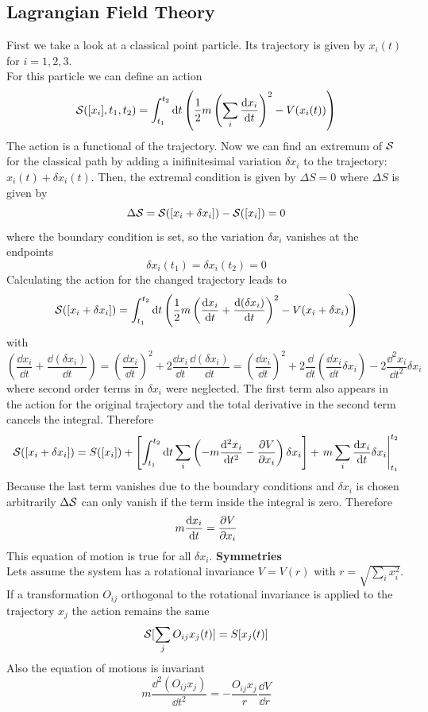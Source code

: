 \subsection{Lagrangian Field Theory}
First we take a look at a classical point particle. Its trajectory is given by $x_i(t)$ for $i = 1,2,3$.\\
For this particle we can define an action
\[ \mathcal{S}( [x_i], t_1, t_2 ) = \int_{t_1}^{t_2} {\rm d} t \left(\frac{1}{2} m \left( \sum_i \frac{{\rm d} x_i}{{\rm d} t} \right)^2 - V(x_i(t)) \right)
\]
The action is a functional of the trajectory. Now we can find an extremum of $\mathcal{S}$ for the classical path by adding a inifinitesimal variation $\delta x_i$ to the trajectory: $x_i(t) + \delta x_i(t)$. Then, the extremal condition is given by $\Delta S = 0$ where $\Delta S$ is given by
\[ \Delta \mathcal{S} = \mathcal{S}( [x_i + \delta x_i]) - \mathcal{S}([x_i]) = 0\]
where the boundary condition is set, so the variation $\delta x_i$ vanishes at the endpoints
\[ \delta x_i(t_1) = \delta x_i(t_2) = 0\]
Calculating the action for the changed trajectory leads to
\[ \mathcal{S}( [x_i + \delta x_i]) = \int_{t_1}^{t_2} {\rm d} t \left( \frac{1}{2} m \left( \frac{{\rm d} x_i}{{\rm d} t} + \frac{{\rm d} (\delta x_i)}{{\rm d} t} \right)^2 - V(x_i + \delta x_i) \right)
\]
with
\[  \left( \frac{\dd x_i}{\dd t} + \frac{ \dd ( \delta x_i)}{\dd t} \right) = \left( \frac{ \dd x_i}{\dd t} \right)^2 + 2 \frac{ \dd x_i }{\dd t} \frac{ \dd (\delta x_i)}{\dd t} = \left( \frac{\dd x_i}{\dd t} \right)^2 + 2 \frac{\dd}{\dd t} \left( \frac{\dd x_i}{\dd t} \delta x_i \right) - 2 \frac{ \dd ^2 x_i}{\dd t^2} \delta x_i\]
where second order terms in $\delta x_i$ were neglected. The first term also appears in the action for the original trajectory and the total derivative in the second term cancels the integral. Therefore
\[ 
\mathcal{S}( [x_i + \delta x_i]) = S([x_i]) + \left[ \int_{t_1}^{t_2} {\rm d} t \sum_i \left( -m \frac{{\rm d} ^2 x_i}{{\rm d} t^2} - \frac{\partial V}{\partial x_i} \right) \delta x_i \right] + \left. m \sum_i \frac{{\rm d} x_i}{{\rm d} t} \delta x_i \right|_{t_1}^{t_2}
\]
Because the last term vanishes due to the boundary conditions and $\delta x_i$ is chosen arbitrarily $\Delta \mathcal{S}$ can only vanish if the term inside the integral is zero. Therefore
\[ 
m \frac{{\rm d} x_i }{{\rm d} t} = \frac{\partial V}{\partial x_i}
\]
This equation of motion is true for all $\delta x_i$.
\newline\newline
\textbf{Symmetries}\\
Lets assume the system has a rotational invariance $V = V(r)$ with $r = \sqrt{ \sum_i x_i^2}$. If a transformation $O_{ij}$ orthogonal to the rotational invariance is applied to the trajectory $x_j$ the action remains the same
\[ \mathcal{S}[ \sum_j O_{ij} x_j (t) ] = S[x_j(t)]\]
Also the equation of motions is invariant
\[ m \frac{ \dd^2 ( O_{ij} x_j)}{\dd t^2} = - \frac{ O_{ij} x_j}{r} \frac{\dd V}{\dd r} \]

